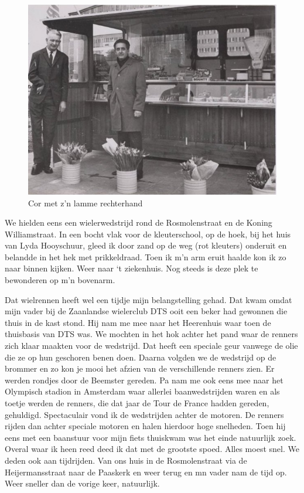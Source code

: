 \documentclass[12pt,twoside, openright]{memoir}
\begin{document}
\begin{figure}
\centering
\includegraphics[width=\textwidth]{img/79corknikker}
\caption*{\footnotesize Cor met z'n lamme rechterhand}
\end{figure}

We hielden eens een wielerwedstrijd rond de Rosmolenstraat en de Koning Williamstraat. In een bocht vlak voor de kleuterschool, op de hoek, bij het huis van Lyda Hooyschuur, gleed ik door zand op de weg (rot kleuters) onderuit en belandde in het hek met prikkeldraad. Toen ik m’n arm eruit haalde kon ik zo naar binnen kijken. Weer naar ‘t ziekenhuis. Nog steeds is deze plek te bewonderen op m’n bovenarm. 

Dat wielrennen heeft wel een tijdje mijn belangstelling gehad. Dat kwam omdat mijn vader bij de Zaanlandse wielerclub DTS ooit een beker had gewonnen die thuis in de kast stond. Hij nam me mee naar het Heerenhuis waar toen de thuisbasis van DTS was. We mochten in het hok achter het pand waar de renners zich klaar maakten voor de wedstrijd. Dat heeft een speciale geur vanwege de olie die ze op hun geschoren benen doen. Daarna volgden we de wedstrijd op de brommer en zo kon je mooi het afzien van de verschillende renners zien. Er werden rondjes door de Beemster gereden. Pa nam me ook eens mee naar het Olympisch stadion in Amsterdam waar allerlei baanwedstrijden waren en als toetje werden de renners, die dat jaar de Tour de France hadden gereden, gehuldigd. Spectaculair vond ik de wedstrijden achter de motoren. De renners rijden dan achter speciale motoren en halen hierdoor hoge snelheden. Toen hij eens met een baanstuur voor mijn fiets thuiskwam was het einde natuurlijk zoek. Overal waar ik heen reed deed ik dat met de grootste spoed. Alles moest snel. We deden ook aan tijdrijden. Van ons huis in de Rosmolenstraat via de Heijermansstraat naar de Paaskerk en weer terug en mn vader nam de tijd op. Weer sneller dan de vorige keer, natuurlijk.
\end{document}
